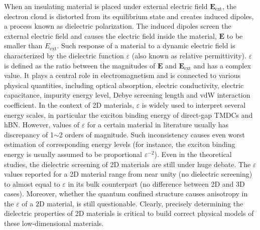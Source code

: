 When an insulating material is placed under external electric field
$\mathbf{E}_{\mathrm{ext}}$, the electron cloud is distorted from its
equilibrium state and creates induced dipoles, a process known as
dielectric polarization. The induced dipoles screen the external
electric field and causes the electric field inside the material,
$\mathbf{E}$ to be smaller than $E_{\mathrm{ext}}$.
%
Such response of a material to a dynamic electric field is
characterized by the dielectric function $\varepsilon$ (also known as
relative permittivity).
%
$\varepsilon$ is defined as the ratio between the magnitudes of
$\mathbf{E}$ and $\mathbf{E}_{\mathrm{ext}}$ and has a complex value.
%
It plays a central role in electromagnetism and is connected
to various physical quantities, including optical absorption, electric
conductivity, electric capacitance, impurity energy level, Debye
screening length and vdW interaction coefficient.
%
In the context of 2D materials, $\varepsilon$ is widely used to
interpret several energy scales, in particular the exciton binding
energy of direct-gap TMDCs and hBN.
%
However, values of $\varepsilon$ for a certain material in literature
usually has discrepancy of 1$\sim{}$2 orders of magnitude. 
%
Such inconsistency causes even worst estimation of corresponding
energy levels (for instance, the exciton binding energy is usually
assumed to be proportional $\varepsilon^{-2}$).
%
Even in the theoretical studies, the dielectric screening of 2D
materials are still under huge debate.  The $\varepsilon$ values
reported for a 2D material range from near unity (\ie no dielectric
screening) to almost equal to $\varepsilon$ in its bulk counterpart
(\ie no difference between 2D and 3D cases). 
%
Moreover, whether the quantum confined structure causes anisotropy in
the $\varepsilon$ of a 2D material, is still questionable.
%
Clearly, precisely determining the dielectric properties of 2D
materials is critical to build correct physical models of these
low-dimensional materials.

